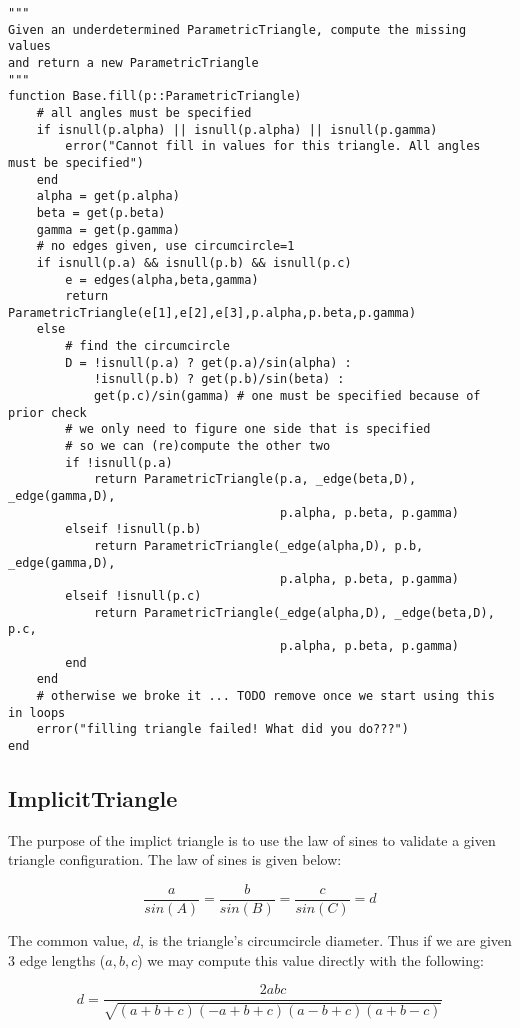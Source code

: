\begin{lstlisting}
"""
Given an underdetermined ParametricTriangle, compute the missing values
and return a new ParametricTriangle
"""
function Base.fill(p::ParametricTriangle)
    # all angles must be specified
    if isnull(p.alpha) || isnull(p.alpha) || isnull(p.gamma)
        error("Cannot fill in values for this triangle. All angles must be specified")
    end
    alpha = get(p.alpha)
    beta = get(p.beta)
    gamma = get(p.gamma)
    # no edges given, use circumcircle=1
    if isnull(p.a) && isnull(p.b) && isnull(p.c)
        e = edges(alpha,beta,gamma)
        return ParametricTriangle(e[1],e[2],e[3],p.alpha,p.beta,p.gamma)
    else
        # find the circumcircle
        D = !isnull(p.a) ? get(p.a)/sin(alpha) :
            !isnull(p.b) ? get(p.b)/sin(beta) :
            get(p.c)/sin(gamma) # one must be specified because of prior check
        # we only need to figure one side that is specified
        # so we can (re)compute the other two
        if !isnull(p.a)
            return ParametricTriangle(p.a, _edge(beta,D), _edge(gamma,D),
                                      p.alpha, p.beta, p.gamma)
        elseif !isnull(p.b)
            return ParametricTriangle(_edge(alpha,D), p.b, _edge(gamma,D),
                                      p.alpha, p.beta, p.gamma)
        elseif !isnull(p.c)
            return ParametricTriangle(_edge(alpha,D), _edge(beta,D), p.c,
                                      p.alpha, p.beta, p.gamma)
        end
    end
    # otherwise we broke it ... TODO remove once we start using this in loops
    error("filling triangle failed! What did you do???")
end
\end{lstlisting}


\subsection{ImplicitTriangle}

The purpose of the implict triangle is to use the law of sines to
validate a given triangle configuration. The law of sines is given
below:

\begin{equation}
\frac{a}{sin(A)} = \frac{b}{sin(B)} = \frac{c}{sin(C)} = d
\end{equation}

The common value, $d$, is the triangle's circumcircle diameter.
Thus if we are given 3 edge lengths ($a, b, c$) we may compute this
value directly
with the following:

\begin{equation}
d = \frac{2abc}{\sqrt{(a+b+c)(-a+b+c)(a-b+c)(a+b-c)}}
\end{equation}

